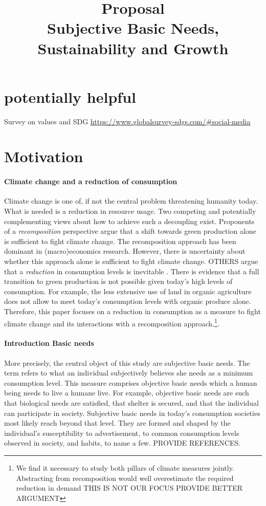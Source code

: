 \documentclass[12pt]{article}
\title{Proposal \\ Subjective Basic Needs, Sustainability and Growth}
\date{}
\begin{document}
	\maketitle
	\tableofcontents
\section{potentially helpful}
Survey on values and SDG \url{https://www.globalsurvey-sdgs.com/#social-media}
\section{Motivation}

\paragraph{Climate change and a reduction of consumption}
Climate change is one of, if not the central problem threatening humanity today. 
What is needed is a reduction in resource usage. Two competing and potentially complementing views about how to achieve such a decoupling exist. 
Proponents of a \textit{recomposition} perspective argue that a shift towards green production alone is sufficient to fight climate change. 
The recomposition approach has been dominant in (macro)economics research. However, there is uncertainty about whether this approach alone is sufficient to fight climate change.
OTHERS argue  that a \textit{reduction} in consumption levels is inevitable \citep[compare][]{Gough2015ClimateNeeds}. 
There is evidence that a full transition to green production is not possible given today's high levels of consumption. 
For example, the less extensive use of land in organic agriculture does not allow to meet today's consumption levels with organic produce alone. 
Therefore,  this paper focuses on a reduction in consumption as a measure to fight climate change and its interactions with a recomposition approach.\footnote{We find it necessary to study both pillars of climate measures jointly. Abstracting from recomposition would well overestimate the required reduction in demand THIS IS NOT OUR FOCUS PROVIDE BETTER ARGUMENT }.

\paragraph{Introduction Basic needs}
 More precisely, the central object of this study are subjective basic needs. The term refers to what an individual subjectively believes she needs as a minimum consumption level. This measure comprises objective basic needs which a human being needs to live a humane live. 
 For example, objective basic needs are such that biological needs are satisfied, that shelter is secured, and that the individual can participate in society. 
Subjective basic needs in today's consumption societies most likely reach beyond that level. They are formed and shaped by the individual's susceptibility to advertisement, to common consumption levels observed in society, and habits, to name a few. PROVIDE REFERENCES. 
\end{document}
